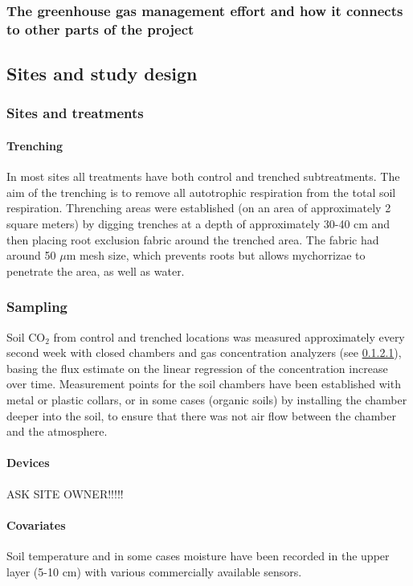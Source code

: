 \documentclass[12pt,a4paper]{article}
\begin{document}
\subsubsection{The greenhouse gas management effort and how it connects to other parts of the project}




\subsection{Sites and study design}

\subsubsection{Sites and treatments}

\paragraph{Trenching}
In most sites all treatments have both control and trenched subtreatments. The aim of the trenching is to remove all autotrophic respiration from the total soil respiration. Threnching areas were established (on an area of approximately 2 square meters) by digging trenches at a depth of approximately 30-40 cm and then placing root exclusion fabric around the trenched area. The fabric had around 50 $\mu$m mesh size, which prevents roots but allows mychorrizae to penetrate the area, as well as water.

\subsubsection{Sampling}
Soil CO$_2$ from control and trenched locations was measured approximately every second week with closed chambers and gas concentration analyzers (see \ref{par:devices}), basing the flux estimate on the linear regression of the concentration increase over time.
Measurement points for the soil chambers have been established with metal or plastic collars, or in some cases (organic soils) by installing the chamber deeper into the soil, to ensure that there was not air flow between the chamber and the atmosphere.

\paragraph{Devices}\label{par:devices}
ASK SITE OWNER!!!!!




\paragraph{Covariates}
Soil temperature and in some cases moisture have been recorded in the upper layer (5-10 cm) with various commercially available sensors.
\end{document}
